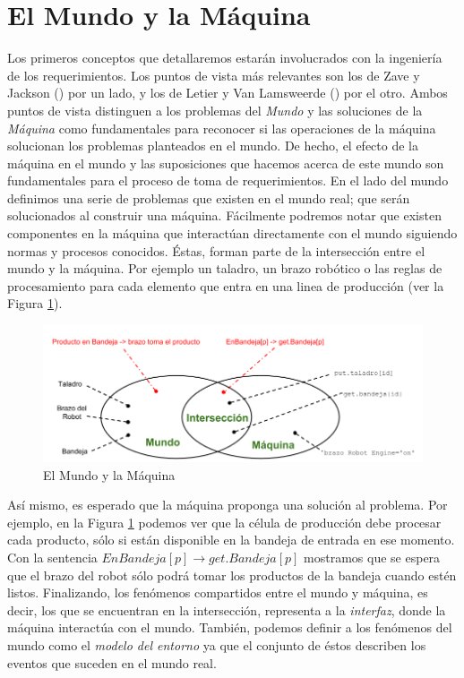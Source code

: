 \section{El Mundo y la Máquina}

Los primeros conceptos que detallaremos estarán involucrados con la ingeniería de los requerimientos. Los puntos de vista
más relevantes son los de Zave y Jackson (\cite{Zave97fourdark, Jackson:1995:SRA:210207, 5071113}) por un lado, y los de
Letier y Van Lamsweerde (\cite{879820, VanLamsweerde:2001:GRE:882477.883624}) por el otro. Ambos puntos de vista
distinguen a los problemas del \emph{Mundo} y las soluciones de la \emph{Máquina} como fundamentales para reconocer si 
las operaciones de la máquina solucionan los problemas planteados en el mundo. De hecho, el efecto de la máquina en el mundo y las
suposiciones que hacemos acerca de este mundo son fundamentales para el proceso de toma de requerimientos. En el lado
del mundo definimos una serie de problemas que existen en el mundo real; que serán solucionados al construir una máquina.
Fácilmente podremos notar que existen componentes en la máquina que interactúan directamente con el mundo siguiendo
normas y procesos conocidos. Éstas, forman parte de la intersección entre el mundo y la máquina. Por ejemplo un taladro,
un brazo robótico o las reglas de procesamiento para cada elemento que entra en una linea de producción (ver la Figura
\ref{world_and_machine}).

\begin{figure}
    \centering
    \includegraphics[scale=0.45]{img/world_and_machine.png}
    \caption{El Mundo y la Máquina}
    \label{world_and_machine}
\end{figure}

Así mismo, es esperado que la máquina proponga una solución al problema. Por ejemplo, en la Figura \ref{world_and_machine}
podemos ver que la célula de producción debe procesar cada producto, sólo si están disponible en la bandeja de entrada en ese
momento. Con la sentencia $EnBandeja[p] \rightarrow get.Bandeja[p]$ mostramos que se espera que el brazo del robot sólo
podrá tomar los productos de la bandeja cuando estén listos. Finalizando, los fenómenos compartidos entre el mundo y
máquina, es decir, los que se encuentran en la intersección, representa a la \emph{interfaz}, donde la máquina
interactúa con el mundo. También, podemos definir a los fenómenos del mundo como el \emph{modelo del entorno} ya que el
conjunto de éstos describen los eventos que suceden en el mundo real.

